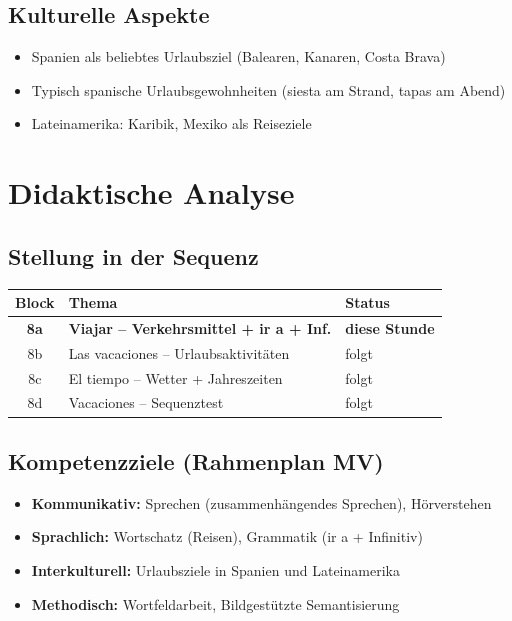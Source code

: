 \documentclass[11pt,a4paper]{article}
\begin{document}
\subsection{Kulturelle Aspekte}
\begin{itemize}
    \item Spanien als beliebtes Urlaubsziel (Balearen, Kanaren, Costa Brava)
    \item Typisch spanische Urlaubsgewohnheiten (siesta am Strand, tapas am Abend)
    \item Lateinamerika: Karibik, Mexiko als Reiseziele
\end{itemize}

\section{Didaktische Analyse}

\subsection{Stellung in der Sequenz}
\begin{tabular}{|c|l|l|}
\hline
\textbf{Block} & \textbf{Thema} & \textbf{Status} \\
\hline
\textbf{8a} & \textbf{Viajar -- Verkehrsmittel + ir a + Inf.} & \textbf{diese Stunde} \\
8b & Las vacaciones -- Urlaubsaktivitäten & folgt \\
8c & El tiempo -- Wetter + Jahreszeiten & folgt \\
8d & Vacaciones -- Sequenztest & folgt \\
\hline
\end{tabular}

\subsection{Kompetenzziele (Rahmenplan MV)}
\begin{itemize}
    \item \textbf{Kommunikativ:} Sprechen (zusammenhängendes Sprechen), Hörverstehen
    \item \textbf{Sprachlich:} Wortschatz (Reisen), Grammatik (ir a + Infinitiv)
    \item \textbf{Interkulturell:} Urlaubsziele in Spanien und Lateinamerika
    \item \textbf{Methodisch:} Wortfeldarbeit, Bildgestützte Semantisierung
\end{itemize}
\end{document}
